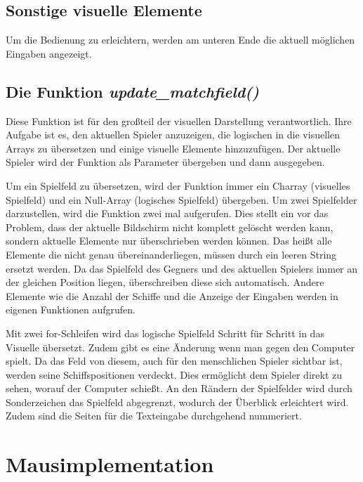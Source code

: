 \documentclass{llncs}
\begin{document}
\subsection{Sonstige visuelle Elemente}

Um die Bedienung zu erleichtern, werden am unteren Ende die aktuell möglichen Eingaben angezeigt.

\subsection{Die Funktion \emph{update\_matchfield()}}

Diese Funktion ist für den großteil der visuellen Darstellung verantwortlich. Ihre Aufgabe ist es, den aktuellen Spieler anzuzeigen, die logischen in die visuellen Arrays zu übersetzen
und einige visuelle Elemente hinzuzufügen. Der aktuelle Spieler wird der Funktion als Parameter übergeben und dann ausgegeben.

Um ein Spielfeld zu übersetzen, wird der Funktion immer ein Charray (visuelles Spielfeld) und ein Null-Array (logisches Spielfeld) übergeben. Um zwei Spielfelder darzustellen,
wird die Funktion zwei mal aufgerufen. Dies stellt ein vor das Problem, dass der aktuelle Bildschirm nicht komplett gelöscht werden kann, sondern aktuelle Elemente nur überschrieben
werden können. Das heißt alle Elemente die nicht genau übereinanderliegen, müssen durch ein leeren String ersetzt werden. Da das Spielfeld des Gegners und des aktuellen Spielers
immer an der gleichen Position liegen, überschreiben diese sich automatisch. Andere Elemente wie die Anzahl der Schiffe und die Anzeige der Eingaben werden in eigenen Funktionen aufgrufen.

Mit zwei for-Schleifen wird das logische Spielfeld Schritt für Schritt in das Visuelle übersetzt. Zudem gibt es eine Änderung wenn man gegen den Computer spielt. Da das Feld von diesem,
auch für den menschlichen Spieler sichtbar ist, werden seine Schiffspositionen verdeckt. Dies ermöglicht dem Spieler direkt zu sehen, worauf der Computer schießt. 
An den Rändern der Spielfelder wird durch Sonderzeichen das Spielfeld abgegrenzt, wodurch der Überblick erleichtert wird. Zudem sind die Seiten für die Texteingabe durchgehend nummeriert.

\section{Mausimplementation}
\end{document}
